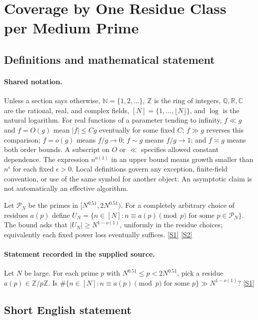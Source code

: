 \documentclass[11pt,a4paper]{article}
\newcommand{\N}{\mathbb{N}}
\newcommand{\Z}{\mathbb{Z}}
\newcommand{\Q}{\mathbb{Q}}
\newcommand{\R}{\mathbb{R}}
\newcommand{\C}{\mathbb{C}}
\newcommand{\sref}[2]{\hyperlink{source:#1:#2}{[S#2]}}
\begin{document}
\section{Coverage by One Residue Class per Medium Prime}\label{statement}


\subsection{Definitions and mathematical statement}

\paragraph{Shared notation.}Unless a section says otherwise, $\N=\{1,2,\ldots\}$,
$\Z$ is the ring of integers, $\Q,\R,\C$ are the rational, real, and complex
fields, $[N]=\{1,\ldots,\lfloor N\rfloor\}$, and $\log$ is the natural
logarithm. For real functions of a parameter tending to infinity,
$f\ll g$ and $f=O(g)$ mean $|f|\leq Cg$ eventually for some fixed $C$;
$f\gg g$ reverses this comparison; $f=o(g)$ means $f/g\to0$;
$f\sim g$ means $f/g\to1$; and $f\asymp g$ means both order bounds.
A subscript on $O$ or $\ll$ specifies allowed constant dependence.
The expression $n^{o(1)}$ in an upper bound means growth smaller than
$n^\epsilon$ for each fixed $\epsilon>0$. Local definitions govern any
exception, finite-field convention, or use of the same symbol for another
object. An asymptotic claim is not automatically an effective algorithm.



Let $\mathcal P_N$ be the primes in $[N^{0.51},2N^{0.51})$. For a completely arbitrary choice of residues $a(p)$ define $U_N=\{n\in[N]:n\equiv a(p)\pmod p\text{ for some }p\in\mathcal P_N\}$. The bound asks that $|U_N|\geq N^{1-o(1)}$, uniformly in the residue choices; equivalently each fixed power loss eventually suffices. \sref{statement}{1} \sref{statement}{2}

\paragraph{Statement recorded in the supplied source.}
Let $N$ be large. For each prime $p$ with $N^{0.51} \leq p < 2N^{0.51}$, pick a residue $a(p) \in \mathbb{Z}/p\mathbb{Z}$. Is $\#\{n \in [N] : n \equiv a(p) \pmod p \text{ for some } p\} \gg N^{1-o(1)}$? \sref{statement}{1}

\subsection{Short English statement}
\end{document}
